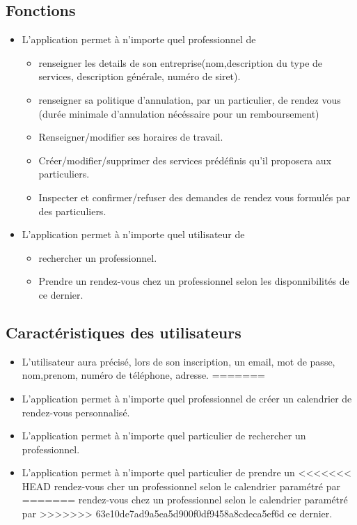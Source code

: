 \documentclass{article}
\begin{document}
\begin{itemize}
\subsection{Fonctions}
\begin{itemize}
<<<<<<< HEAD
\item L'application permet à n'importe quel professionnel de 

	\begin{itemize}
	\item renseigner les details de son entreprise(nom,description du
	type de services, description générale, numéro de siret).
	\item renseigner sa politique d'annulation, par un particulier, de rendez vous (durée minimale d'annulation nécéssaire pour un remboursement)
	\item Renseigner/modifier ses horaires de travail.
	\item Créer/modifier/supprimer des services prédéfinis qu'il proposera aux particuliers.
	\item Inspecter et confirmer/refuser des demandes de rendez vous formulés par des particuliers.
	\end{itemize}
\item L'application permet à n'importe quel utilisateur de

 	\begin{itemize}
	\item rechercher un professionnel.
	\item Prendre un rendez-vous chez un professionnel selon les disponnibilités de
	ce dernier.
	\end{itemize}
\end{itemize}
\subsection{Caractéristiques des utilisateurs}
\begin{itemize}
\item L'utilisateur aura précisé, lors de son inscription, un email, mot
de passe, nom,prenom, numéro de téléphone, adresse.
=======
\item L'application permet à n'importe quel professionnel de créer un
calendrier de rendez-vous personnalisé.
\item L'application permet à n'importe quel particulier de rechercher
  un professionnel.
\item L'application permet à n'importe quel particulier de prendre un
<<<<<<< HEAD
  rendez-vous cher un professionnel selon le calendrier paramétré par
=======
  rendez-vous chez un professionnel selon le calendrier paramétré par
>>>>>>> 63e10de7ad9a5ea5d900f0df9458a8cdeca5ef6d
  ce dernier.
\end{itemize}

\end{itemize}
\end{document}
